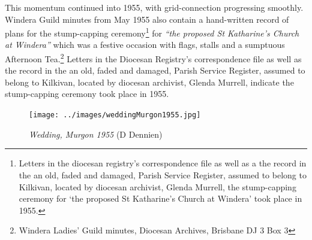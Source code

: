 This momentum continued into 1955, with grid-connection progressing smoothly. Windera Guild minutes from May 1955 also contain a hand-written record of plans for the stump-capping ceremony\footnote{Letters in the diocesan registry's correspondence file as well as a the record in the an old, faded and damaged, Parish Service Register, assumed to belong to Kilkivan, located by diocesan archivist, Glenda Murrell, the stump-capping ceremony for `the proposed St Katharine's Church at Windera' took place in 1955.} for \emph{``the proposed St Katharine's Church at Windera''} which was a festive occasion with flags, stalls and a sumptuous Afternoon Tea.\footnote{Windera Ladies' Guild minutes, Diocesan Archives, Brisbane DJ 3 Box 3} Letters in the Diocesan Registry's correspondence file as well as the record in the an old, faded and damaged, Parish Service Register, assumed to belong to Kilkivan, located by diocesan archivist, Glenda Murrell, indicate the stump-capping ceremony took place in 1955.








\begin{figure}
\begin{center}
\texttt{[image: ../images/weddingMurgon1955.jpg]}
\caption{{\itshape Wedding, Murgon 1955} {\scriptsize(D Dennien)}}
\end{center}
\end{figure}










